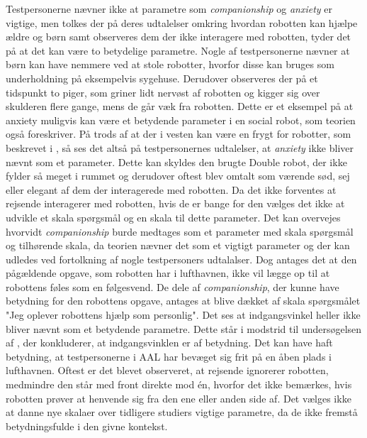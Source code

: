 Testpersonerne nævner ikke at parametre som \textit{companionship} og \textit{anxiety} er vigtige, men tolkes der på deres udtalelser omkring hvordan robotten kan hjælpe ældre og børn samt observeres dem der ikke interagere med robotten, tyder det på at det kan være to betydelige parametre. Nogle af testpersonerne nævner at børn kan have nemmere ved at stole robotter, hvorfor disse kan bruges som underholdning på eksempelvis sygehuse. Derudover observeres der på et tidspunkt to piger, som griner lidt nervøst af robotten og kigger sig over skulderen flere gange, mens de går væk fra robotten. Dette er et eksempel på at anxiety muligvis kan være et betydende parameter i en social robot, som teorien også foreskriver.
%
På trods af at der i vesten kan være en frygt for robotter, som beskrevet i , så ses det altså på testpersonernes udtalelser, at \textit{anxiety} ikke bliver nævnt som et parameter. Dette kan skyldes den brugte Double robot, der ikke fylder så meget i rummet og derudover oftest blev omtalt som værende sød, sej eller elegant af dem der interagerede med robotten. Da det ikke forventes at rejsende interagerer med robotten, hvis de er bange for den vælges det ikke at udvikle et skala spørgsmål og en skala til dette parameter. Det kan overvejes hvorvidt \textit{companionship} burde medtages som et parameter med skala spørgsmål og tilhørende skala, da teorien nævner det som et vigtigt parameter og der kan udledes ved fortolkning af nogle testpersoners udtalalser. Dog antages det at den pågældende opgave, som robotten har i lufthavnen, ikke vil lægge op til at robottens føles som en følgesvend. De dele af \textit{companionship}, der kunne have betydning for den robottens opgave, antages at blive dækket af skala spørgsmålet "Jeg oplever robottens hjælp som personlig". \blankline
%
Det ses at indgangsvinkel heller ikke bliver nævnt som et betydende parametre. Dette står i modstrid til undersøgelsen af \textcite{PDF:HowMayIServeYou}, der konkluderer, at indgangsvinklen er af betydning. Det kan have haft betydning, at testpersonerne i AAL har bevæget sig frit på en åben plads i lufthavnen. Oftest er det blevet observeret, at rejsende ignorerer robotten, medmindre den står med front direkte mod én, hvorfor det ikke bemærkes, hvis robotten prøver at henvende sig fra den ene eller anden side af. Det vælges ikke at danne nye skalaer over tidligere studiers vigtige parametre, da de ikke fremstå betydningsfulde i den givne kontekst. 




